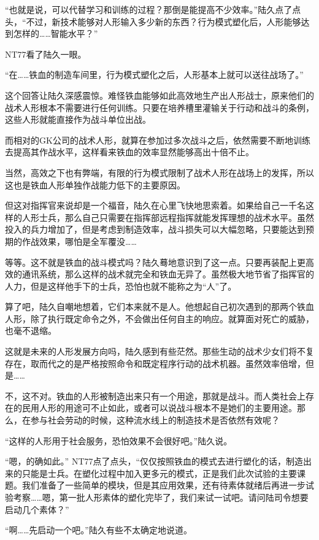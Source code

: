 “也就是说，可以代替学习和训练的过程？那倒是能提高不少效率。”陆久点了点头，“不过，新技术能够对人形输入多少新的东西？行为模式塑化后，人形能够达到怎样的……智能水平？”

NT77看了陆久一眼。

“在……铁血的制造车间里，行为模式塑化之后，人形基本上就可以送往战场了。”

这个回答让陆久深感震惊。难怪铁血能够如此高效地生产出人形战士，原来他们的战术人形根本不需要进行任何训练。只要在培养槽里灌输关于行动和战斗的条例，这些人形就能直接作为战斗单位出战。

而相对的GK公司的战术人形，就算在参加过多次战斗之后，依然需要不断地训练去提高其作战水平，这样看来铁血的效率显然能够高出十倍不止。

当然，高效之下也有弊端，有限的行为模式限制了战术人形在战场上的发挥，所以这也是铁血人形单独作战能力低下的主要原因。

但这对指挥官来说却是一个福音，陆久在心里飞快地思索着。如果给自己一千名这样的人形士兵，那么自己只需要在指挥部远程指挥就能发挥理想的战术水平。虽然投入的兵力增加了，但是考虑到制造效率，战斗损失可以大幅忽略，只要能达到预期的作战效果，哪怕是全军覆没……

等等。这不就是铁血的战斗模式吗？陆久蓦地意识到了这一点。只要再装配上更高效的通讯系统，那么这样的战术就完全和铁血无异了。虽然极大地节省了指挥官的人力，但是这样他手下的士兵，恐怕也就不能称之为“人”了。

算了吧，陆久自嘲地想着，它们本来就不是人。他想起自己初次遇到的那两个铁血人形，除了执行既定命令之外，不会做出任何自主的响应。就算面对死亡的威胁，也毫不退缩。

这就是未来的人形发展方向吗，陆久感到有些茫然。那些生动的战术少女们将不复存在，取而代之的是严格按照命令和既定程序行动的战术机器。虽然效率倍增，但是……

不，这不对。铁血的人形被制造出来只有一个用途，那就是战斗。而人类社会上存在的民用人形的用途可不止如此，或者可以说战斗根本不是她们的主要用途。那么，在参与社会劳动的时候，这种流水线上的制造技术是否依然有效呢？

“这样的人形用于社会服务，恐怕效果不会很好吧。”陆久说。

“嗯，的确如此。” NT77点了点头，“仅仅按照铁血的模式去进行塑化的话，制造出来的只能是士兵。在塑化过程中加入更多元的模式，正是我们此次试验的主要课题。我们准备了一些简单的模块，但是其应用效果，还有待素体就绪后再进一步试验考察……嗯，第一批人形素体的塑化完毕了，我们来试一试吧。请问陆司令想要启动几个素体？”

“啊……先启动一个吧。”陆久有些不太确定地说道。

